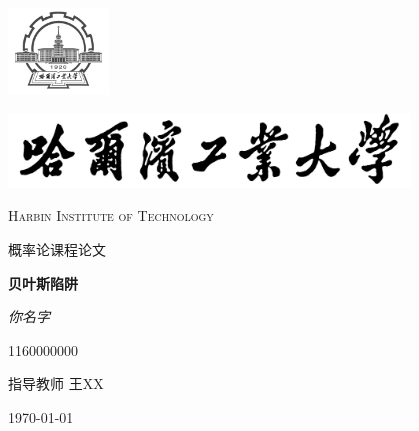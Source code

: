 \documentclass[12pt,a4paper]{report}
\begin{document}
\begin{titlepage}
	\centering
	\includegraphics[width=0.2\textwidth]{sf1.png}\par
	\vspace{1cm}
	\includegraphics[width=0.8\textwidth]{sf.jpg}\par
	\vspace{0.1cm}
	{\scshape\LARGE Harbin Institute of Technology \par}
	\vspace{1cm}
	{\kaishu\LARGE 概率论课程论文\par}
	\vspace{1.5cm}
	{\huge\bfseries 贝叶斯陷阱\par}
	\vspace{2cm}
	{\fangsong\Large\itshape 你名字\par}
	\vfill
	{1160000000}\par

	\vfill
	指导教师	\textsc{王XX}
	\vfill
	{\large \today\par}
\end{titlepage}
\end{document}
